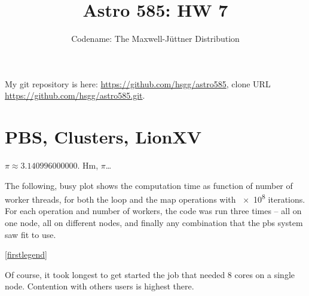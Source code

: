 \documentclass[11pt]{article}
\title{Astro 585: HW 7}
\author{Codename: The Maxwell-Jüttner Distribution}
\begin{document}
\maketitle

My git repository is here: \url{https://github.com/hsgg/astro585}, clone URL
\url{https://github.com/hsgg/astro585.git}.


\section{PBS, Clusters, LionXV}

$\pi \approx \num{3.140996000000}$. Hm, $\pi$\ldots

The following, busy plot shows the computation time as function of number of
worker threads, for both the loop and the map operations with \num{e8}
iterations. For each operation and number of workers, the code was run three
times -- all on one node, all on different nodes, and finally any combination
that the pbs system saw fit to use.

\begin{center}
  \ref{firstlegend}
\end{center}

Of course, it took longest to get started the job that needed 8 cores on a
single node. Contention with others users is highest there.
\end{document}
